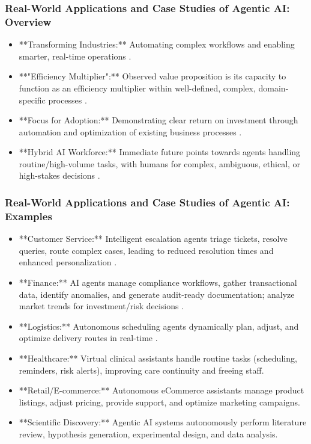 \documentclass{beamer}       %
\begin{document}
\begin{frame}
    \frametitle{Real-World Applications and Case Studies of Agentic AI: Overview}
    \begin{itemize}
        \item **Transforming Industries:** Automating complex workflows and enabling smarter, real-time operations .
        \item **"Efficiency Multiplier":** Observed value proposition is its capacity to function as an efficiency multiplier within well-defined, complex, domain-specific processes .
        \item **Focus for Adoption:** Demonstrating clear return on investment through automation and optimization of existing business processes .
        \item **Hybrid AI Workforce:** Immediate future points towards agents handling routine/high-volume tasks, with humans for complex, ambiguous, ethical, or high-stakes decisions .
    \end{itemize}
\end{frame}

\begin{frame}
    \frametitle{Real-World Applications and Case Studies of Agentic AI: Examples}
    \tiny
    \begin{itemize}
        \item **Customer Service:** Intelligent escalation agents triage tickets, resolve queries, route complex cases, leading to reduced resolution times and enhanced personalization .
        \item **Finance:** AI agents manage compliance workflows, gather transactional data, identify anomalies, and generate audit-ready documentation; analyze market trends for investment/risk decisions .
        \item **Logistics:** Autonomous scheduling agents dynamically plan, adjust, and optimize delivery routes in real-time .
        \item **Healthcare:** Virtual clinical assistants handle routine tasks (scheduling, reminders, risk alerts), improving care continuity and freeing staff.
        \item **Retail/E-commerce:** Autonomous eCommerce assistants manage product listings, adjust pricing, provide support, and optimize marketing campaigns.
        \item **Scientific Discovery:** Agentic AI systems autonomously perform literature review, hypothesis generation, experimental design, and data analysis.
    \end{itemize}
\end{frame}
\end{document}
